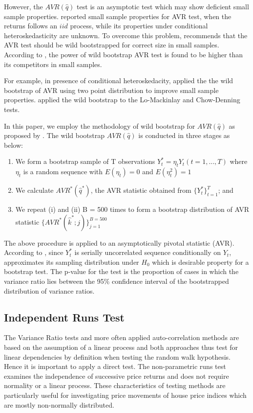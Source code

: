\documentclass[AEJ,reqno, draftmode]{AEA}
\begin{document}
However, the $AVR(\hat{q})$ test is an asymptotic test which may show deficient small sample properties. \citet{choi1999testing} reported small sample properties for AVR test, when the returns follows an $iid$ process, while its properties under conditional heteroskedasticity are unknown.  To overcome this problem, \citet{kim2009automatic} recommends that the AVR test should be wild bootstrapped for correct size in small samples. According to \citet{kim2009automatic}, the power of wild bootstrap AVR test is found to be higher than its competitors in small samples.

For example, in presence of conditional heteroskedacity, \citet{mammen1993bootstrap} applied the the wild bootstrap of AVR using two point distribution to improve small sample properties. \citet{kim2006wild} applied the wild bootstrap to the Lo-Mackinlay and Chow-Denning tests. 

In this paper, we employ the methodology of wild bootstrap for $AVR(\hat{q})$ as proposed by \citet{kim2009automatic}. The wild bootstrap $AVR(\hat{q})$ is conducted in three stages as below:

\begin{enumerate}[i]
    \item We form a bootstrap sample of T observations $Y^*_t = \eta_t Y_t(t=1,...,T)$ where $\eta_t$ is a random sequence with $E(\eta_t) = 0$ and $E(\eta_t^2)=1$
    \item We calculate $AVR^*(\hat{q}^*)$, the AVR statistic obtained from $\{Y^*_t\}_{t=1}^T$; and
    \item We repeat (i) and (ii) B = 500 times to form a bootstrap distribution of AVR statistic $\{AVR^*(\hat{k}^*;j)\}_{j=1}^{B=500}$
\end{enumerate}

The above procedure is applied to an asymptotically pivotal statistic (AVR). According to \citet{kim2009automatic}, since $Y_t^*$ is serially uncorrelated sequence conditionally on $Y_t$, approximates its sampling distribution under $H_0$ which is desirable property for a bootstrap test. The p-value for the test is the proportion of cases in which the variance ratio lies between the 95\% confidence interval of the bootstrapped distribution of variance ratios.


\subsection{Independent Runs Test}

The Variance Ratio tests and more often applied auto-correlation methods are based on the assumption of a linear process and both approaches thus test for linear dependencies by definition when testing the random walk hypothesis. Hence it is important to apply a direct test. The non-parametric runs test examines the independence of successive price returns and does not require normality or a linear process. These characteristics of testing methods are particularly useful for investigating price movements of house price indices which are mostly non-normally distributed.
\end{document}
